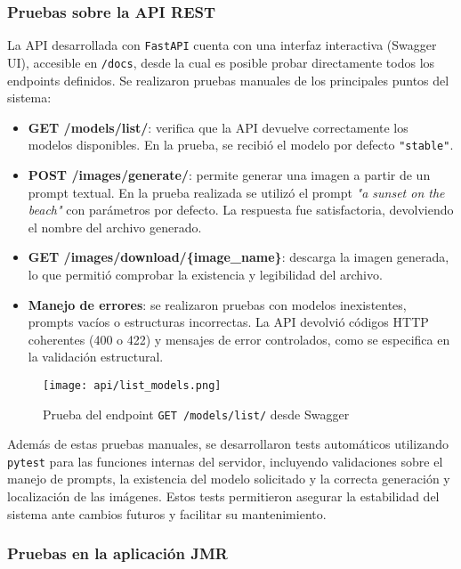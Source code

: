 \subsubsection{Pruebas sobre la API REST}

La API desarrollada con \texttt{FastAPI} cuenta con una interfaz interactiva (Swagger UI), accesible en \texttt{/docs}, desde la cual es posible probar directamente todos los endpoints definidos. Se realizaron pruebas manuales de los principales puntos del sistema:

\begin{itemize}
    \item \textbf{GET /models/list/}: verifica que la API devuelve correctamente los modelos disponibles. En la prueba, se recibió el modelo por defecto \texttt{"stable"}.

    \item \textbf{POST /images/generate/}: permite generar una imagen a partir de un prompt textual. En la prueba realizada se utilizó el prompt \textit{"a sunset on the beach"} con parámetros por defecto. La respuesta fue satisfactoria, devolviendo el nombre del archivo generado.

    \item \textbf{GET /images/download/\{image\_name\}}: descarga la imagen generada, lo que permitió comprobar la existencia y legibilidad del archivo.

    \item \textbf{Manejo de errores}: se realizaron pruebas con modelos inexistentes, prompts vacíos o estructuras incorrectas. La API devolvió códigos HTTP coherentes (400 o 422) y mensajes de error controlados, como se especifica en la validación estructural.
\end{itemize}

\begin{figure}[H]
    \centering
    \texttt{[image: api/list\_models.png]}
    \caption{Prueba del endpoint \texttt{GET /models/list/} desde Swagger}
\end{figure}

Además de estas pruebas manuales, se desarrollaron tests automáticos utilizando \texttt{pytest} para las funciones internas del servidor, incluyendo validaciones sobre el manejo de prompts, la existencia del modelo solicitado y la correcta generación y localización de las imágenes. Estos tests permitieron asegurar la estabilidad del sistema ante cambios futuros y facilitar su mantenimiento.


\subsubsection{Pruebas en la aplicación JMR}

